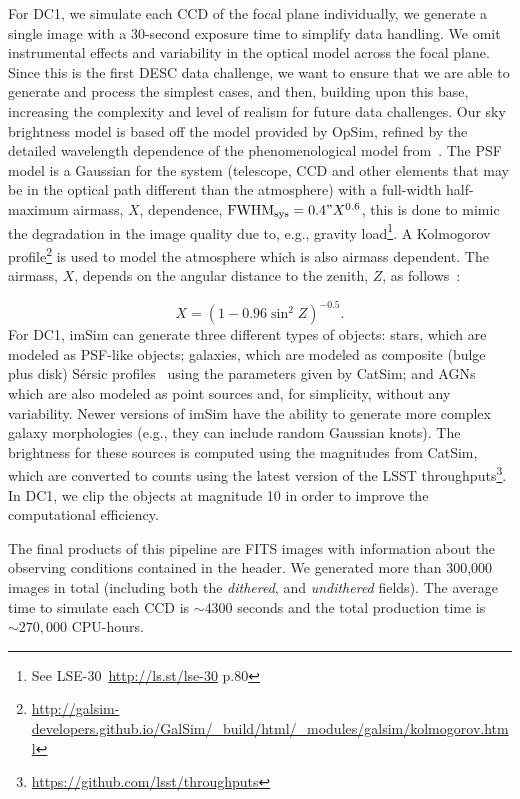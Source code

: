 \documentclass[\docopts]{\docclass}
\begin{document}
For DC1, we simulate each CCD of the focal plane individually, we generate a single image with a 30-second exposure time to simplify data handling. We omit instrumental effects and variability in the optical model across the focal plane. Since this is the first DESC data challenge, we want to ensure that we are able to generate and process the simplest cases, and then, building upon this base, increasing the complexity and level of realism for future data challenges. Our sky brightness model is based off the \citet{1991PASP..103.1033K} model provided by OpSim, refined by the detailed wavelength dependence of the phenomenological model from~\citet{2016SPIE.9910E..1AY}. The PSF model is a Gaussian for the system (telescope, CCD and other elements that may be in the optical path different than the atmosphere) with a full-width half-maximum airmass, $X$, dependence, $\mathrm{FWHM_{sys}} = 0.4" X^{0.6}$, this is done to mimic the degradation in the image quality due to, e.g., gravity load\footnote{See LSE-30~\url{http://ls.st/lse-30} p.80}. A Kolmogorov profile\footnote{\url{http://galsim-developers.github.io/GalSim/_build/html/_modules/galsim/kolmogorov.html}} is used to model the atmosphere which is also airmass dependent. The airmass, $X$, depends on the angular distance to the zenith, $Z$, as follows~\citep{1991PASP..103.1033K}:

\begin{equation}
X = (1 - 0.96\sin^{2}{Z})^{-0.5}.
\end{equation}
For DC1, imSim can generate three different types of objects: stars, which are modeled as PSF-like objects; galaxies, which are modeled as composite (bulge plus disk) S\'{e}rsic profiles~\citep{1963BAAA....6...41S} using
the parameters given by CatSim; and AGNs which are also modeled as point sources and, for simplicity, without any variability. Newer versions of imSim have the ability to generate more complex galaxy morphologies (e.g., they can include random Gaussian knots). The brightness for these sources is computed using the magnitudes from CatSim, which are converted to counts using the latest version of the LSST throughputs\footnote{\url{https://github.com/lsst/throughputs}}. In DC1, we clip the objects at magnitude 10 in order to improve the computational efficiency.

The final products of this pipeline are FITS images with information about the observing conditions contained in the header. We generated more than 300,000 images in total (including both the \textit{dithered}, and \textit{undithered} fields). The average time to simulate each CCD is $\sim 4300$ seconds and the total production time is $\sim 270,000$ CPU-hours.
\end{document}

